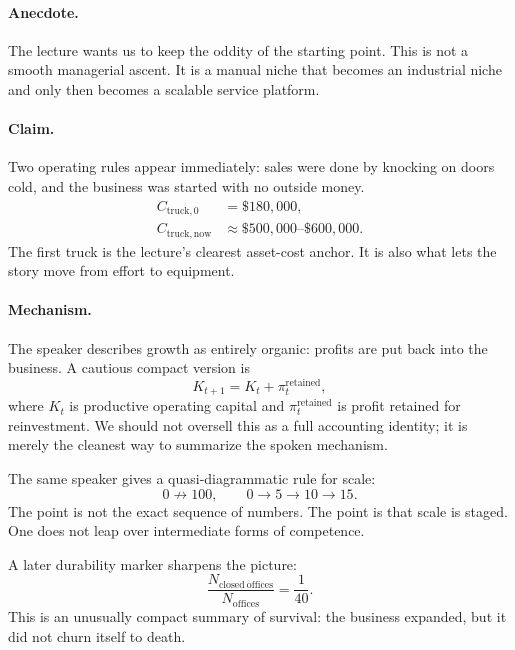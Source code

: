 \paragraph{Anecdote.} The lecture wants us to keep the oddity of the starting point. This is not a smooth managerial ascent. It is a manual niche that becomes an industrial niche and only then becomes a scalable service platform.

\paragraph{Claim.} Two operating rules appear immediately: sales were done by knocking on doors cold, and the business was started with no outside money.
\begin{align}
C_{\mathrm{truck},0} &= \$180{,}000,\\
C_{\mathrm{truck},\mathrm{now}} &\approx \$500{,}000\text{--}\$600{,}000.
\end{align}
The first truck is the lecture's clearest asset-cost anchor. It is also what lets the story move from effort to equipment.

\paragraph{Mechanism.} The speaker describes growth as entirely organic: profits are put back into the business. A cautious compact version is
\begin{equation}
K_{t+1}=K_t+\pi_t^{\mathrm{retained}},
\end{equation}
where \(K_t\) is productive operating capital and \(\pi_t^{\mathrm{retained}}\) is profit retained for reinvestment. We should not oversell this as a full accounting identity; it is merely the cleanest way to summarize the spoken mechanism.

The same speaker gives a quasi-diagrammatic rule for scale:
\begin{equation}
0 \not\to 100,\qquad 0 \to 5 \to 10 \to 15.
\end{equation}
The point is not the exact sequence of numbers. The point is that scale is staged. One does not leap over intermediate forms of competence.

A later durability marker sharpens the picture:
\begin{equation}
\frac{N_{\mathrm{closed\ offices}}}{N_{\mathrm{offices}}}=\frac{1}{40}.
\end{equation}
This is an unusually compact summary of survival: the business expanded, but it did not churn itself to death.

